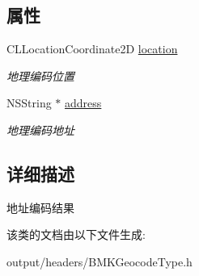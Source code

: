 \subsection*{属性}
\begin{DoxyCompactItemize}
\item 
\hypertarget{interface_b_m_k_geo_code_result_a4f2aaf9561f955a26979d388557ff31b}{}C\+L\+Location\+Coordinate2\+D \hyperlink{interface_b_m_k_geo_code_result_a4f2aaf9561f955a26979d388557ff31b}{location}\label{interface_b_m_k_geo_code_result_a4f2aaf9561f955a26979d388557ff31b}

\begin{DoxyCompactList}\small\item\em 地理编码位置 \end{DoxyCompactList}\item 
\hypertarget{interface_b_m_k_geo_code_result_a828c8d7063323c1540e9d66bdf0df22c}{}N\+S\+String $\ast$ \hyperlink{interface_b_m_k_geo_code_result_a828c8d7063323c1540e9d66bdf0df22c}{address}\label{interface_b_m_k_geo_code_result_a828c8d7063323c1540e9d66bdf0df22c}

\begin{DoxyCompactList}\small\item\em 地理编码地址 \end{DoxyCompactList}\end{DoxyCompactItemize}


\subsection{详细描述}
地址编码结果 

该类的文档由以下文件生成\+:\begin{DoxyCompactItemize}
\item 
output/headers/B\+M\+K\+Geocode\+Type.\+h\end{DoxyCompactItemize}
